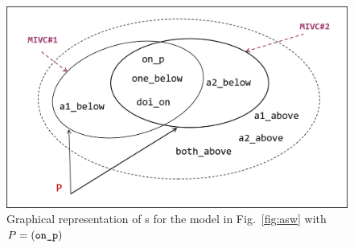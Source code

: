 
\begin{figure}[t]
 \centering
  \includegraphics[width=0.9\columnwidth]{figs/ivcs.png}
  \vspace{-0.1in}
  \caption{Graphical representation of \mivc s for the model in Fig.~\ref{fig:asw}
  with  $P = (\small{\texttt{on\_p}})$}
  \label{fig:ivcs}
  \vspace{-0.2in}
\end{figure}





